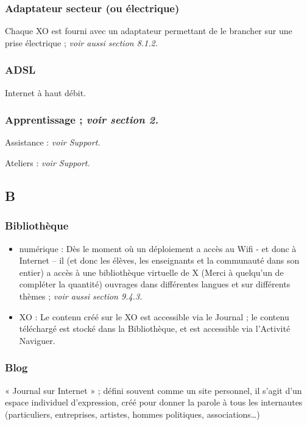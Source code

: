 \documentclass[12pt]{article}
\begin{document}
\subsubsection{Adaptateur secteur (ou électrique)}
\label{sec-14-1-2}


Chaque XO est fourni avec un adaptateur permettant de le brancher sur une
prise électrique ; \emph{voir aussi section 8.1.2.}
\subsubsection{ADSL}
\label{sec-14-1-3}


Internet à haut débit.
\subsubsection{Apprentissage ; \emph{voir section 2.}}
\label{sec-14-1-4}


Assistance : \emph{voir Support.}

Ateliers : \emph{voir Support.}
\subsection{B}
\label{sec-14-2}
\subsubsection{Bibliothèque}
\label{sec-14-2-1}


\begin{itemize}
\item numérique : Dès le moment où un déploiement a accès au Wifi - et donc à
  Internet – il (et donc les élèves, les enseignants et la communauté dans
  son entier) a accès à une bibliothèque virtuelle de X (Merci à quelqu'un
  de compléter la quantité) ouvrages dans différentes langues et sur
  différents thèmes ; \emph{voir aussi section 9.4.3.}
\item XO : Le contenu créé sur le XO est accessible via le Journal ; le contenu
  téléchargé est stocké dans la Bibliothèque, et est accessible via
  l'Activité Naviguer.
\end{itemize}
\subsubsection{Blog}
\label{sec-14-2-2}


« Journal sur Internet » ; défini souvent comme un site personnel, il
s'agit d'un espace individuel d'expression, créé pour donner la parole à
tous les internautes (particuliers, entreprises, artistes, hommes
politiques, associations\ldots{})
\end{document}
